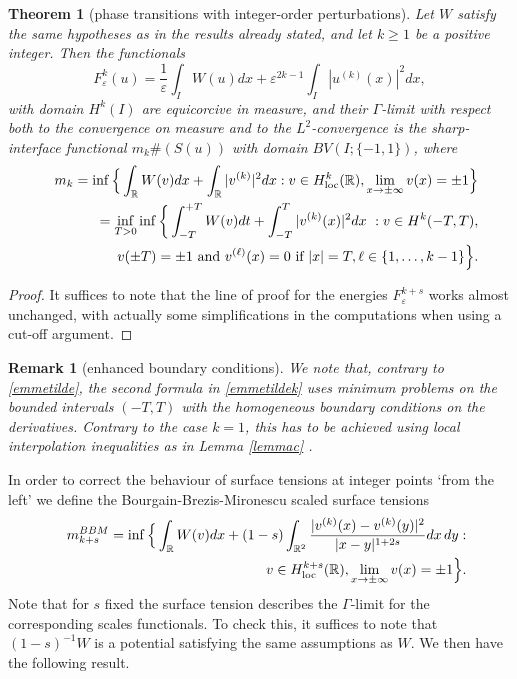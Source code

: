 \documentclass{article}
\newtheorem{remark}[lemma]{Remark}
\newtheorem{theorem}[lemma]{Theorem}
\newcommand{\e}{\varepsilon}
\begin{document}
\begin{theorem}[phase transitions with integer-order perturbations] Let $W$ satisfy the same hypotheses as in the results already stated, and let $k\ge 1$ be a positive integer. Then the functionals
 \begin{equation}\label{k}
F^{k}_\e(u)=\frac1\e\int_I W(u)dx+ \e^{2k-1} \int_{I}{|u^{(k)}(x)|^2}dx,
\end{equation}
with domain $H^k(I)$ are equicorcive in measure, and their $\Gamma$-limit with respect both to the convergence on measure and to the $L^2$-convergence is the sharp-interface functional $m_k\#(S(u))$ with domain $BV(I;\{-1,1\})$, where
\begin{eqnarray}\label{emmek}\nonumber
&&m_{k} =\inf\Big\{\int_{\mathbb R} W(v)dx+\int_{\mathbb R}|v^{(k)}|^2dx:v\in H^{k}_{\rm loc}(\mathbb R), \lim_{x\to\pm\infty}v(x)=\pm1\Big\}\\
\label{emmetildek}\nonumber
&&\hskip1cm =\inf_{T>0} \inf\bigg\{\int_{-T}^{+T} W(v)dt +\int_{-T}^T{|v^{(k)}(x)|^2}dx\ :
v\in H^{k}(-T,T), \\
&&\hskip1.2cm v(\pm T)=\pm1 \hbox{ \rm and } v^{(\ell)}(x)=0 \hbox{ \rm if }|x|= T, \ell\in\{1,\ldots,k-1\}\Big\}.
\end{eqnarray}
\end{theorem}

\begin{proof} It suffices to note that the line of proof for the energies $F^{k+s}_\e$ works almost unchanged, with actually some simplifications in the computations when using a cut-off argument.
\end{proof}

\begin{remark}[enhanced boundary conditions]\rm
We note that, contrary to \eqref{emmetilde}, the second formula in \eqref{emmetildek} uses minimum problems on the bounded intervals $(-T,T)$ with the homogeneous boundary conditions on the derivatives. Contrary to the case $k=1$, this has to be achieved using local interpolation inequalities  as in Lemma \ref{lemmac} \cite{Solci,BDS}.
\end{remark}

In order to correct the behaviour of surface tensions at integer points `from the left' we define the Bourgain-Brezis-Mironescu scaled surface tensions
\begin{eqnarray}\label{emmeks}\nonumber
&&m^{BBM}_{k+s} =\inf\Big\{\int_{\mathbb R} W(v)dx+(1-s)\int_{\mathbb R^2}\frac{|v^{(k)}(x)-v^{(k)}(y)|^2}{|x-y|^{1+2s}} dx\,dy :\\
&& \hskip4.5cm v\in H^{k+s}_{\rm loc}(\mathbb R), \lim_{x\to\pm\infty}v(x)=\pm1\Big\}.
\end{eqnarray}
Note that for $s$ fixed the surface tension describes the $\Gamma$-limit for the corresponding scales functionals.
To check this, it suffices to note that $(1-s)^{-1}W$ is a potential satisfying the same assumptions as $W$. We then have the following result.
\end{document}
